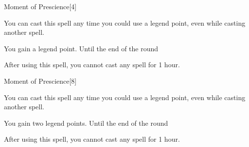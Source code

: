 \begin{spellsection}{Moment of Prescience}[4]
    \begin{spellheader}
    \end{spellheader}
    \begin{spellcontent}
        \begin{spelltargetinginfo}
            \spellspecial You can cast this spell any time you could use a legend point, even while casting another spell.
        \end{spelltargetinginfo}
        \begin{spelleffects}
            \spelleffect You gain a legend point.
            \spelldur Until the end of the round
        \end{spelleffects}
    \end{spellcontent}
    \begin{spellfooter}
        \spellnotes After using this spell, you cannot cast any  spell for 1 hour.
        \miscastexplode
    \end{spellfooter}
\end{spellsection}

\begin{spellsection}[Greater]{Moment of Prescience}[8]
    \begin{spellheader}
    \end{spellheader}
    \begin{spellcontent}
        \begin{spelltargetinginfo}
            \spellspecial You can cast this spell any time you could use a legend point, even while casting another spell.
        \end{spelltargetinginfo}
        \begin{spelleffects}
            \spelleffect You gain two legend points.
            \spelldur Until the end of the round
        \end{spelleffects}
    \end{spellcontent}
    \begin{spellfooter}
        \spellnotes After using this spell, you cannot cast any  spell for 1 hour.
        \miscastexplode
    \end{spellfooter}
\end{spellsection}

